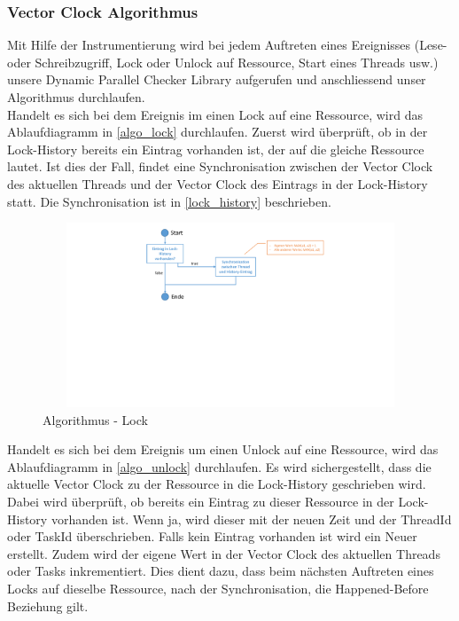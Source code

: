 \documentclass[10pt,a4paper]{article}
\begin{document}
\subsubsection{Vector Clock Algorithmus}\label{vector_algorithm}
\begin{flushleft}
Mit Hilfe der Instrumentierung wird bei jedem Auftreten eines Ereignisses (Lese- oder Schreibzugriff, Lock oder Unlock auf Ressource, Start eines Threads usw.) unsere Dynamic Parallel Checker Library aufgerufen und anschliessend unser Algorithmus durchlaufen.\\[0.3cm]
Handelt es sich bei dem Ereignis im einen Lock auf eine Ressource, wird das Ablaufdiagramm in \autoref{algo_lock} durchlaufen. Zuerst wird überprüft, ob in der Lock-History bereits ein Eintrag vorhanden ist, der auf die gleiche Ressource lautet. Ist dies der Fall, findet eine Synchronisation zwischen der Vector Clock des aktuellen Threads und der Vector Clock des Eintrags in der Lock-History statt. Die Synchronisation ist in \ref{lock_history} beschrieben.\\
\begin{figure}[H]
\centering
	\includegraphics[width=14cm,height=5.5cm,trim=70mm 110mm 70mm 5mm, clip]{images/Lock.pdf}
\caption{Algorithmus - Lock}\label{algo_lock}
\end{figure}
Handelt es sich bei dem Ereignis um einen Unlock auf eine Ressource, wird das Ablaufdiagramm in \autoref{algo_unlock} durchlaufen. Es wird sichergestellt, dass die aktuelle Vector Clock zu der Ressource in die Lock-History geschrieben wird. Dabei wird überprüft, ob bereits ein Eintrag zu dieser Ressource in der Lock-History vorhanden ist. Wenn ja, wird dieser mit der neuen Zeit und der ThreadId oder TaskId überschrieben. Falls kein Eintrag vorhanden ist wird ein Neuer erstellt. Zudem wird der eigene Wert in der Vector Clock des aktuellen Threads oder Tasks inkrementiert. Dies dient dazu, dass beim nächsten Auftreten eines Locks auf dieselbe Ressource, nach der Synchronisation, die Happened-Before Beziehung gilt. \\

\end{flushleft}
\end{document}
